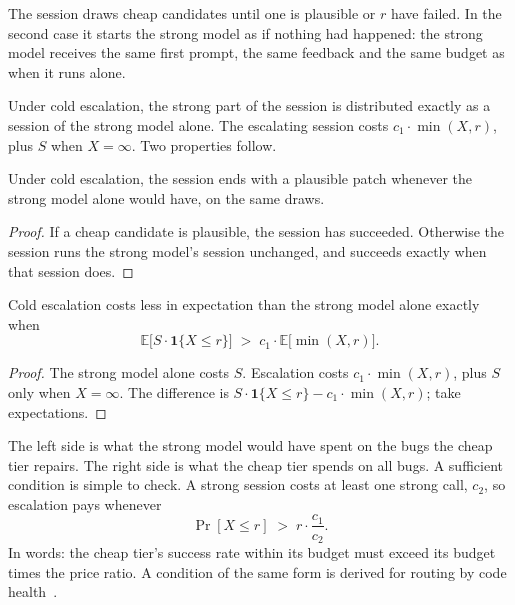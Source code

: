 \begin{definition}
\label{def:cold}
The session draws cheap candidates until one is plausible or $r$ have failed.
In the second case it starts the strong model as if nothing had happened: the
strong model receives the same first prompt, the same feedback and the same
budget as when it runs alone.
\end{definition}

Under cold escalation, the strong part of the session is distributed exactly
as a session of the strong model alone. The escalating session costs
$c_1 \cdot \min(X, r)$, plus $S$ when $X = \infty$. Two properties follow.

\begin{proposition}
\label{prop:nolost}
Under cold escalation, the session ends with a plausible patch whenever the
strong model alone would have, on the same draws.
\end{proposition}
\begin{proof}
If a cheap candidate is plausible, the session has succeeded. Otherwise the
session runs the strong model's session unchanged, and succeeds exactly when
that session does.
\end{proof}

\begin{proposition}
\label{prop:breakeven}
Cold escalation costs less in expectation than the strong model alone exactly
when
\[
\mathbb{E}\bigl[S \cdot \mathbf{1}\{X \le r\}\bigr] \;>\; c_1 \cdot \mathbb{E}\bigl[\min(X, r)\bigr] .
\]
\end{proposition}
\begin{proof}
The strong model alone costs $S$. Escalation costs $c_1 \cdot \min(X, r)$, plus
$S$ only when $X = \infty$. The difference is
$S \cdot \mathbf{1}\{X \le r\} - c_1 \cdot \min(X, r)$; take expectations.
\end{proof}

The left side is what the strong model would have spent on the bugs the cheap
tier repairs. The right side is what the cheap tier spends on all bugs. A
sufficient condition is simple to check. A strong session costs at least one
strong call, $c_2$, so escalation pays whenever
\begin{equation}
\Pr[X \le r] \;>\; r \cdot \frac{c_1}{c_2} .
\label{eq:bg-sufficient}
\end{equation}
In words: the cheap tier's success rate within its budget must exceed its
budget times the price ratio. A condition of the same form is derived for
routing by code health~\citep{madeyski2026triage}.

